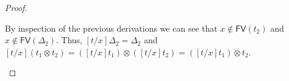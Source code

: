 \documentclass{elsarticle}
\newcommand{\FILLnt}[1]{\mathit{#1}}
\newcommand{\FILLmv}[1]{\mathit{#1}}
\newcommand{\FILLsym}[1]{#1}
\begin{document}
\begin{proof}
\begin{report}
\begin{itemize}
\begin{center}
\end{center}
By inspection of the previous derivations we can see that $ \FILLmv{x}  \not\in \mathsf{FV}(  \FILLnt{t_{{\mathrm{2}}}}  ) $ and $ \FILLmv{x}  \not\in \mathsf{FV}(  \Delta_{{\mathrm{2}}}  ) $.  Thus, $\FILLsym{[}  \FILLnt{t}  \FILLsym{/}  \FILLmv{x}  \FILLsym{]}  \Delta_{{\mathrm{2}}}  \FILLsym{=}  \Delta_{{\mathrm{2}}}$ and
$\FILLsym{[}  \FILLnt{t}  \FILLsym{/}  \FILLmv{x}  \FILLsym{]}   (  \FILLnt{t_{{\mathrm{1}}}}  \otimes  \FILLnt{t_{{\mathrm{2}}}}  )   \FILLsym{=}    ( \FILLsym{[}  \FILLnt{t}  \FILLsym{/}  \FILLmv{x}  \FILLsym{]}  \FILLnt{t_{{\mathrm{1}}}} )   \otimes   ( \FILLsym{[}  \FILLnt{t}  \FILLsym{/}  \FILLmv{x}  \FILLsym{]}  \FILLnt{t_{{\mathrm{2}}}} )   =   ( \FILLsym{[}  \FILLnt{t}  \FILLsym{/}  \FILLmv{x}  \FILLsym{]}  \FILLnt{t_{{\mathrm{1}}}} )   \otimes  \FILLnt{t_{{\mathrm{2}}}} $.


\end{itemize}
\end{report}
\end{proof}
\end{document}

